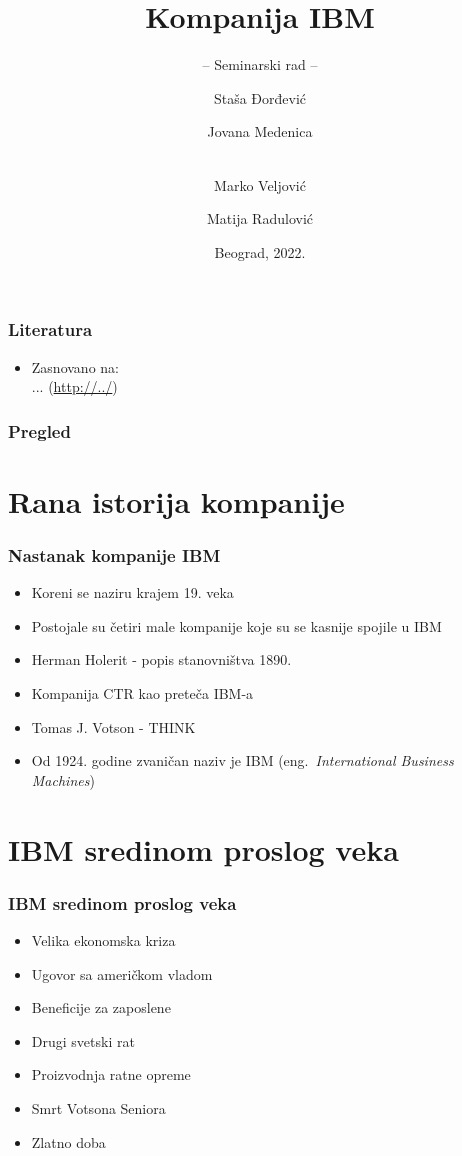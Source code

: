\documentclass{beamer}
\title[]{Kompanija IBM}
\subtitle{-- Seminarski rad --}
\author[]{Staša Đorđević \and
Jovana Medenica \and  \\
Marko Veljović \and
Matija Radulović}
\institute[]{Matematički fakultet\\Univerzitet u Beogradu}
\date{
    \footnotesize{Beograd, 2022.}	
}
\begin{document}
\begin{frame}
	\thispagestyle{empty}
	\titlepage
\end{frame}

\begin{frame}[fragile]\frametitle{Literatura}
	\begin{itemize}
		\item Zasnovano na:\\
		...
		(\url{http://../})
	\end{itemize}
\end{frame}

\begin{frame}
	\frametitle{Pregled} %
	\tableofcontents[hidesubsections] 
\end{frame}

\section{Rana istorija kompanije}

\begin{frame}[fragile]\frametitle{Nastanak kompanije IBM}
	\begin{itemize}	
		\item Koreni se naziru krajem 19. veka
		\item Postojale su četiri male kompanije koje su se kasnije spojile u IBM
		\item Herman Holerit - popis stanovništva 1890.
		\item Kompanija CTR kao preteča IBM-a
		\item Tomas J. Votson - THINK
		\item Od 1924. godine zvaničan naziv je IBM (eng.~{\em International Business Machines})
		\end{itemize}
\end{frame}

\section{IBM sredinom proslog veka}

\begin{frame}[fragile]\frametitle{IBM sredinom proslog veka}
	\begin{itemize}	
		\item Velika ekonomska kriza
		\item Ugovor sa američkom vladom
		\item Beneficije za zaposlene
            \item Drugi svetski rat
            \item Proizvodnja ratne opreme
            \item Smrt Votsona Seniora
            \item Zlatno doba
	\end{itemize}
\end{frame}
\end{document}
